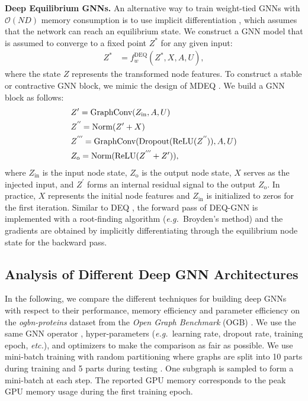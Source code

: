\documentclass{article}
\newcommand{\eg}{\emph{e.g.~}}
\newcommand{\etc}{\emph{etc.\xspace}}
\newcommand*{\mydprime}{^{\prime\prime}\mkern-1.2mu}
\newcommand*{\mytrprime}{^{\prime\prime\prime}\mkern-1.2mu}
\newcommand{\mysection}[1]{\vspace{0pt}\noindent\textbf{#1.}}
\begin{document}
\mysection{Deep Equilibrium GNNs}
An alternative way to train weight-tied GNNs with $\mathcal{O}(ND)$ memory consumption is to use implicit differentiation \citep{scarselli2008graph, bai2019deep}, which assumes that the network can reach an equilibrium state. We construct a GNN model that is assumed to converge to a fixed point $Z^{*}$ for any given input:
\begin{align}
Z^{*} &= f_{w}^{\text{DEQ}}(Z^{*}, X, A, U),
\end{align}
where the state $Z$ represents the transformed node features. To construct a stable or contractive GNN block, we mimic the design of MDEQ \citep{bai2020multiscale}. We build a GNN block as follows:
\begin{align}
& Z^{\prime} = \text{GraphConv}(Z_{\text{in}}, A, U) \\
& Z^{\mydprime} = \text{Norm}(Z^{\prime} + X) \\
& Z^{\mytrprime} = \text{GraphConv}(\text{Dropout}(\text{ReLU}(Z^{\mydprime})), A, U) \\
& Z_{\text{o}} = \text{Norm}(\text{ReLU}(Z^{\mytrprime} + Z^{\prime})),
\end{align}
where $Z_{\text{in}}$ is the input node state, $Z_{\text{o}}$ is the output node state, $X$ serves as the injected input, and $Z^{\prime}$ forms an internal residual signal to the output $Z_{\text{o}}$. In practice, $X$ represents the initial node features and $Z_{\text{in}}$ is initialized to zeros for the first iteration. Similar to DEQ \citep{bai2019deep}, the forward pass of DEQ-GNN is implemented with a root-finding algorithm (\eg Broyden’s method) and the gradients are obtained by implicitly differentiating through the equilibrium node state for the backward pass.

\subsection{Analysis of Different Deep GNN Architectures} \label{sec:analysis_deep}
In the following, we compare the different techniques for building deep GNNs with respect to their performance, memory efficiency and parameter efficiency on the \emph{ogbn-proteins} dataset from the \emph{Open Graph Benchmark} (OGB) \citep{hu2020open}. We use the same GNN operator \citep{li2020deepergcn}, hyper-parameters (\eg learning rate, dropout rate, training epoch, \etc), and optimizers to make the comparison as fair as possible.
We use mini-batch training with random partitioning where graphs are split into 10 parts during training and 5 parts during testing \citep{li2020deepergcn}. One subgraph is sampled to form a mini-batch at each step. 
The reported GPU memory corresponds to the peak GPU memory usage during the first training epoch.
\end{document}
